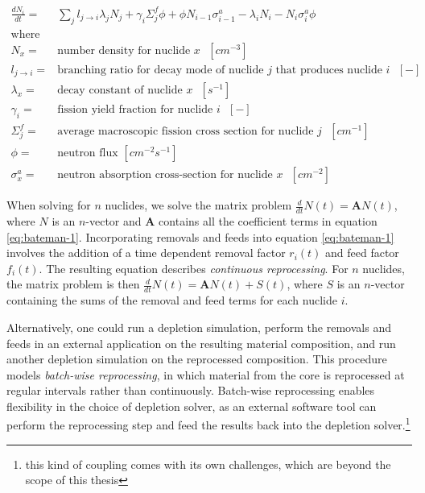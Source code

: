 \begin{align}
    \label{eq:bateman-1}
    \frac{dN_{i}}{dt} =& \sum_{j} l_{j\to i}\lambda_{j} N_{j} + \gamma_{i} \Sigma^{f}_{j}\phi + \phi N_{i-1} \sigma^{a}_{i-1} - \lambda_{i}N_{i} - N_{i}\sigma^{a}_{i}\phi\\
    \text{where} & \nonumber \\
    N_{x} =& \text{number density for nuclide $x$ $[cm^{-3}]$}\nonumber\\
    l_{j\to i} =& \text{branching ratio for decay mode of nuclide $j$ that produces nuclide $i$ $[-]$}\nonumber\\
    \lambda_{x} =& \text{decay constant of nuclide $x$ $[s^{-1}]$}\nonumber\\
    \gamma_{i} =& \text{fission yield fraction for nuclide $i$ $[-]$}\nonumber \\
    \Sigma^{f}_{j} =& \text{average macroscopic fission cross section for nuclide $j$ $[cm^{-1}]$}\nonumber\\
    \phi =& \text{neutron flux $[cm^{-2}s^{-1}]$}\nonumber\\
    \sigma^{a}_{x} =& \text{neutron absorption cross-section for nuclide $x$ $[cm^{-2}]$}\nonumber
\end{align}
    
When solving for $n$ nuclides, we solve the matrix problem
$\frac{d}{dt}N(t) = \mathbf{A}N(t)$, where $N$ is an $n$-vector and
$\mathbf{A}$ contains all the coefficient terms in equation \ref{eq:bateman-1}.
Incorporating removals and feeds into equation \ref{eq:bateman-1} involves the
addition of a time dependent removal factor $r_{i}(t)$ and feed factor
$f_{i}(t)$. The resulting equation describes {\it continuous reprocessing}.
For $n$ nuclides, the matrix problem is then
$\frac{d}{dt}N(t) = \mathbf{A}N(t) + S(t)$, where $S$ is an $n$-vector
containing the sums of the removal and feed terms for each nuclide $i$.%

Alternatively, one could run a depletion simulation, perform the removals and
feeds in an external application on the resulting material composition, and run
another depletion simulation on the reprocessed composition. This procedure
models {\it batch-wise reprocessing}, in which material from the core is
reprocessed at regular intervals rather than continuously. Batch-wise
reprocessing enables flexibility in the choice of depletion solver, as an
external software tool can perform the reprocessing step and feed the results
back into the depletion solver.\footnote{this kind of coupling comes with its
own challenges, which are beyond the scope of this thesis}


